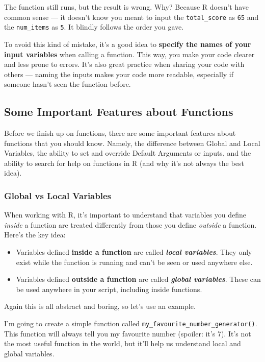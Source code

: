 \documentclass[
]{book}
\begin{document}
The function still runs, but the result is wrong. Why? Because R doesn't have common sense --- it doesn't know you meant to input the \texttt{total\_score} as \texttt{65} and the \texttt{num\_items} as \texttt{5}. It blindly follows the order you gave.

To avoid this kind of mistake, it's a good idea to \textbf{specify the names of your input variables} when calling a function. This way, you make your code clearer and less prone to errors. It's also great practice when sharing your code with others --- naming the inputs makes your code more readable, especially if someone hasn't seen the function before.

\subsection{Some Important Features about Functions}\label{some-important-features-about-functions}

Before we finish up on functions, there are some important features about functions that you should know. Namely, the difference between Global and Local Variables, the ability to set and override Default Arguments or inputs, and the ability to search for help on functions in R (and why it's not always the best idea).

\subsubsection{Global vs Local Variables}\label{global-vs-local-variables}

When working with R, it's important to understand that variables you define \emph{inside} a function are treated differently from those you define \emph{outside} a function. Here's the key idea:

\begin{itemize}
\item
  Variables defined \textbf{inside a function} are called \textbf{\emph{local variables}}. They only exist while the function is running and can't be seen or used anywhere else.
\item
  Variables defined \textbf{outside a function} are called \textbf{\emph{global variables}}. These can be used anywhere in your script, including inside functions.
\end{itemize}

Again this is all abstract and boring, so let's use an example.

I'm going to create a simple function called \texttt{my\_favourite\_number\_generator()}. This function will always tell you my favourite number (spoiler: it's 7). It's not the most useful function in the world, but it'll help us understand local and global variables.
\end{document}
